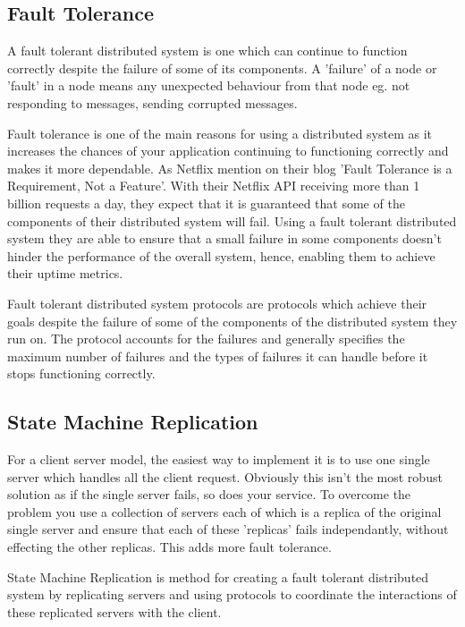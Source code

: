 \subsection{Fault Tolerance}
A fault tolerant distributed system is one which can continue to function correctly
despite the failure of some of its components. A 'failure' of a node or 'fault' in a node
means any unexpected behaviour from that node eg. not responding to messages, sending
corrupted messages.

Fault tolerance is one of the main reasons for using a distributed system as it
increases the chances of your application continuing to functioning correctly and
makes it more dependable. As Netflix mention on their blog
'Fault Tolerance is a Requirement, Not a Feature'.
With their Netflix API receiving more than 1 billion requests a day, they expect
that it is guaranteed that some of the components of their distributed system will fail.
Using a fault tolerant distributed system they are able to ensure that a small failure
in some components doesn't hinder the performance of the overall system, hence,
enabling them to achieve their uptime metrics.

Fault tolerant distributed system protocols are protocols which achieve their
goals despite the failure of some of the components of the distributed system they run on.
The protocol accounts for the failures and generally specifies the maximum number of
failures and the types of failures it can handle before it stops functioning correctly.

\subsection{State Machine Replication}

For a client server model, the easiest way to implement it is to use one single server
which handles all the client request. Obviously this isn't the most robust solution
as if the single server fails, so does your service. To overcome the problem you
use a collection of servers each of which is a replica of the original single server and
ensure that each of these 'replicas' fails independantly, without effecting the other replicas.
This adds more fault tolerance.

State Machine Replication is method for creating a fault tolerant distributed system
by replicating servers and using protocols to coordinate the interactions of these
replicated servers with the client.

